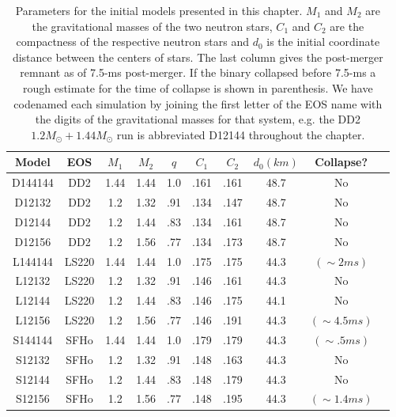 \begin{table}
\centering
\begin{tabular}{cccccccccl} \toprule
Model & EOS & \(M_{1}\) & \(M_{2}\) & \(q\) & $C_1$ & $C_2$ & $d_0 (km)$  & Collapse?\\ \midrule
D144144 & DD2 & 1.44 & 1.44 & 1.0 & .161 & .161 & 48.7 & No \\
D12132 & DD2 & 1.2 & 1.32 & .91 & .134 & .147 & 48.7 & No\\
D12144 & DD2 & 1.2 & 1.44 & .83 & .134 & .161 & 48.7 & No\\
D12156 & DD2 & 1.2 & 1.56 & .77 & .134 & .173 & 48.7 & No\\
 \midrule
L144144 & LS220 & 1.44 & 1.44 & 1.0 &.175  &.175 & 44.3 & $(\sim 2 ms)$\\
L12132 & LS220 & 1.2 & 1.32 & .91 & .146 & .161  & 44.3 & No \\
L12144 & LS220 & 1.2 & 1.44 & .83 & .146  &.175  & 44.1 & No\\
L12156 & LS220 & 1.2 & 1.56 & .77 & .146  & .191 & 44.3 & $(\sim 4.5 ms)$\\
 \midrule
S144144 & SFHo & 1.44 & 1.44 & 1.0 &.179  & .179 & 44.3 & $(\sim .5 ms)$\\
S12132 & SFHo & 1.2 & 1.32 & .91 & .148  & .163  & 44.3 & No\\
S12144 & SFHo & 1.2 & 1.44 & .83 & .148  & .179 & 44.3 & No\\
S12156 & SFHo & 1.2 & 1.56 & .77 & .148  & .195 & 44.3 & $(\sim 1.4 ms)$\\
 \bottomrule
\end{tabular}
\caption{Parameters for the initial models presented in this chapter. $M_1$ and $M_2$ are the gravitational masses of the two neutron stars, $C_1$ and $C_2$ are the compactness of the respective neutron stars and $d_0$ is the initial coordinate distance between the centers of stars. The last column gives the post-merger remnant as of 7.5-ms post-merger. If the binary collapsed before 7.5-ms a rough estimate for the time of collapse is shown in parenthesis. We have codenamed each simulation by joining the first letter of the EOS name with the digits of the gravitational masses for that system, e.g. the DD2 $1.2M_\odot + 1.44M_\odot$ run is abbreviated D12144 throughout the chapter.}
\label{tab:initial_models}
\end{table}


